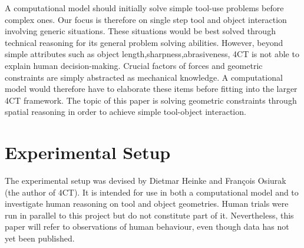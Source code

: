 \documentclass[11]{article}
\begin{document}
A computational model should initially solve simple tool-use problems before complex ones.
Our focus is therefore on single step tool and object interaction involving generic situations.
These situations would be best solved through technical reasoning for its general problem solving abilities. 
However, beyond simple attributes such as object length,sharpness,abrasiveness, 4CT is not able to explain human decision-making.
Crucial factors of forces and geometric constraints are simply abstracted as mechanical knowledge. 
A computational model would therefore have to elaborate these items before fitting into the larger 4CT framework. 
The topic of this paper is solving geometric constraints through spatial reasoning in order to achieve simple tool-object interaction.  

\section{Experimental Setup}

The experimental setup was devised by Dietmar Heinke and Fran\c{c}ois Osiurak (the author of 4CT). 
It is intended for use in both a computational model and to investigate human reasoning on tool and object geometries. 
Human trials were run in parallel to this project but do not constitute part of it. 
Nevertheless, this paper will refer to observations of human behaviour, even though data has not yet been published. 
\end{document}

